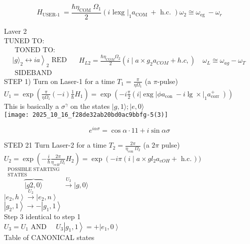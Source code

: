 $$
H_{\text {USER-1 }}=\frac{\hbar \eta_{\text {COM }} \Omega_{1}}{2}\left(i \text { lexg }\left.\right|_{1} a_{\text {COM }}+\text { h.c. }\right) \omega_{2} \cong \omega_{\text {eg }}-\omega_{r}
$$

Laver 2\\
TUNED TO:\\
$\begin{aligned} & \text { TONED TO: } \\ & \left.|g\rangle_{2} \leftrightarrow i a\right\rangle_{2} \text { RED } \\ & \text { SIDEBAND }\end{aligned} \quad H_{L 2}=\frac{\hbar \eta_{C O M} \Omega_{2}}{2}\left(i \mid a \times g_{2} a_{C O M}+h . c,\right) \quad \omega_{L} \cong \omega_{a g}-\omega_{T}$\\
STEP 1) Turn on Laser-1 for a time $T_{1}=\frac{\pi}{\eta \Omega_{1}}$ (a $\pi$-pulse)\\
$U_{1}=\exp \left(\frac{\pi}{\eta \Omega_{1}}(-i) \frac{1}{\hbar} H_{1}\right)=\exp \left(-i \frac{\pi}{2}\left(i|\operatorname{exg}| \phi a_{\text {con }}-i \lg \times\left.\right|_{1} a_{\text {corr }}^{+}\right)\right)$\\
This is basically a $\sigma^{\gamma}$ on the states $|g, 1\rangle ;|e, 0\rangle$\\
\texttt{[image: 2025\_10\_16\_f28de32ab20bd0ac9bbfg-5(3)]}

$$
e^{i \alpha \sigma}=\cos \alpha \cdot 11+i \sin \alpha \sigma
$$

STED 21 Turn Laser-2 for a time $T_{2}=\frac{2 \pi}{\eta_{\text {con }} \Omega_{2}}$ (a $2 \pi$ pulse)\\
$U_{2}=\exp \left(-\frac{i}{\hbar} \frac{2 \pi}{\eta_{c cH} \Omega_{i}} H_{2}\right)=\exp \left(-i \pi\left(i \mid a \times g l_{2} a_{c O H}+\right.\right.$ h.c. $\left.)\right)$\\
$\overbrace{|g 2,0\rangle}^{\substack{\text { POSSIBLE STARTING } \\ \text { STATES }}} \xrightarrow{U_{2}}|g, 0\rangle$\\
$\left|e_{2}, h\right\rangle \xrightarrow{U_{2}}\left|e_{2}, n\right\rangle$\\
$\left|g_{2}, 1\right\rangle \longrightarrow-\left|g_{1}, 1\right\rangle$\\
Step 3 identical to step 1\\
$U_{3}=U_{1}$ AND $\quad U_{3}\left|g_{1}, 1\right\rangle=+\left|e_{1}, 0\right\rangle$\\
Table of CANONICAL states

